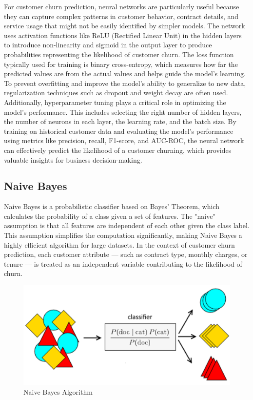 For customer churn prediction, neural networks are particularly useful because they can capture complex patterns in customer behavior, contract details, and service usage that might not be easily identified by simpler models. The network uses activation functions like ReLU (Rectified Linear Unit) in the hidden layers to introduce non-linearity and sigmoid in the output layer to produce probabilities representing the likelihood of customer churn. The loss function typically used for training is binary cross-entropy, which measures how far the predicted values are from the actual values and helps guide the model’s learning.\\

To prevent overfitting and improve the model’s ability to generalize to new data, regularization techniques such as dropout and weight decay are often used. Additionally, hyperparameter tuning plays a critical role in optimizing the model’s performance. This includes selecting the right number of hidden layers, the number of neurons in each layer, the learning rate, and the batch size. By training on historical customer data and evaluating the model’s performance using metrics like precision, recall, F1-score, and AUC-ROC, the neural network can effectively predict the likelihood of a customer churning, which provides valuable insights for business decision-making. 
\subsection{Naive Bayes}
Naive Bayes is a probabilistic classifier based on Bayes' Theorem, which calculates the probability of a class given a set of features. The "naive" assumption is that all features are independent of each other given the class label. This assumption simplifies the computation significantly, making Naive Bayes a highly efficient algorithm for large datasets. In the context of customer churn prediction, each customer attribute — such as contract type, monthly charges, or tenure — is treated as an independent variable contributing to the likelihood of churn.\\

\begin{figure}[hbt!]
    \centering
    \includegraphics[width=1\linewidth]{Images/3.3b.png}
    \caption{Naive Bayes Algorithm}
    \label{fig:enter-label}
\end{figure}


